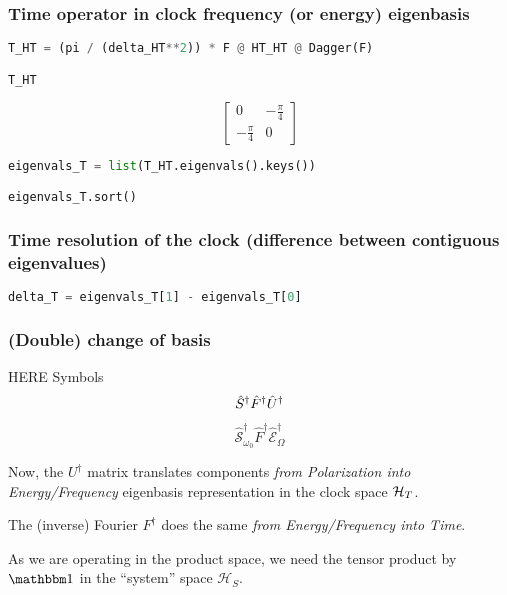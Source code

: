 \subsubsection*{Time operator in clock frequency (or energy) eigenbasis}

\begin{lstlisting}[language=Python]
T_HT = (pi / (delta_HT**2)) * F @ HT_HT @ Dagger(F) 

T_HT
\end{lstlisting}
$$
  \left[\begin{matrix}0 & - \frac{\pi}{4}\\- \frac{\pi}{4} & 0\end{matrix}\right]
$$
\begin{lstlisting}[language=Python]
eigenvals_T = list(T_HT.eigenvals().keys())

eigenvals_T.sort()
\end{lstlisting}

\subsubsection*{Time resolution of the clock (difference between contiguous eigenvalues)}

\begin{lstlisting}[language=Python]
delta_T = eigenvals_T[1] - eigenvals_T[0]
\end{lstlisting}

\subsubsection*{(Double) change of basis}

HERE Symbols
\begin{equation}
\hat{S}^{\dagger}\hat{F}^{\dagger}\hat{U}^{\dagger}
\end{equation}

\begin{equation}
  \hat{\mathcal{S}}_{\omega_0}^{\dagger} \hat{F}^{\dagger} \hat{\mathcal{E}}_{\Omega}^{\dagger}
\end{equation}

Now, the $U^{\dagger}$ matrix translates components \emph{from Polarization into Energy/Frequency} eigenbasis representation
in the clock space $\mathcal{H}_T$.

The (inverse) Fourier $F^{\dagger}$ does the same \emph{from Energy/Frequency into Time}.

As we are operating in the product space, we need the tensor product by $\idop$ in the ``system'' space $\mathcal{H}_S$.

